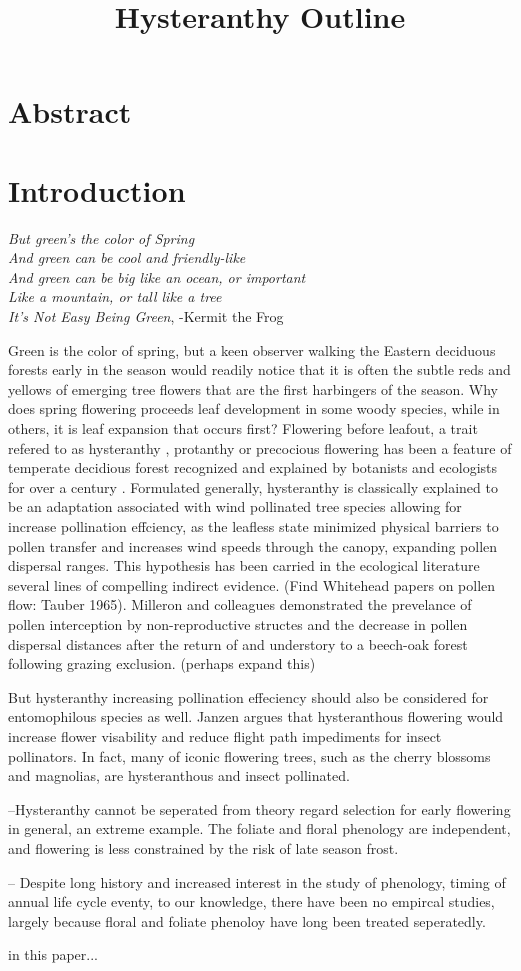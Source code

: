 \documentclass{article}\usepackage[]{graphicx}\usepackage[]{color}
\begin{document}
\title{Hysteranthy Outline}

\section{Abstract}
\section{Introduction}
\textit{
But green's the color of Spring\\
And green can be cool and friendly-like\\
And green can be big like an ocean, or important\\
Like a mountain, or tall like a tree}\\
\textit{It's Not Easy Being Green}, -Kermit the Frog
\par
Green is the color of spring, but a keen observer walking the Eastern deciduous forests early in the season would readily notice that it is often the subtle reds and yellows of emerging tree flowers that are the first harbingers of the season. Why does spring flowering proceeds leaf development in some woody species, while in others, it is leaf expansion that occurs first? Flowering before leafout, a trait refered to as hysteranthy \citep{}, protanthy \citep{} or precocious flowering \citep{} has been a feature of temperate decidious forest recognized and explained by botanists and ecologists for over a century \citep{}. Formulated generally, hysteranthy is classically explained to be an adaptation associated with wind pollinated tree species allowing for increase pollination effciency\citep{}, as the leafless state minimized physical barriers to pollen transfer \citep{} and increases wind speeds through the canopy, expanding pollen dispersal ranges\citep{}. This hypothesis has been carried in the ecological literature several lines of compelling indirect evidence. (Find Whitehead papers on pollen flow: Tauber 1965). Milleron and colleagues \citeyear{} demonstrated the prevelance of pollen interception by non-reproductive structes and the decrease in pollen dispersal distances after the return of and understory to a beech-oak forest following grazing exclusion. (perhaps expand this)
\par
But hysteranthy increasing pollination effeciency should also be considered for entomophilous species as well. Janzen \citeyear{} argues that hysteranthous flowering would increase flower visability and reduce flight path impediments for insect pollinators. In fact, many of iconic flowering trees, such as the cherry blossoms and magnolias, are hysteranthous and insect pollinated.
\par
--Hysteranthy cannot be seperated from theory regard selection for early flowering in general, an extreme example. The foliate and floral phenology are independent, and flowering is less constrained by the risk of late season frost.
\par
-- Despite long history and increased interest in the study of phenology, timing of annual life cycle eventy,  to our knowledge, there have been no empircal studies, largely because floral and foliate phenoloy have long been treated seperatedly.
\par
in this paper...
\end{document}
